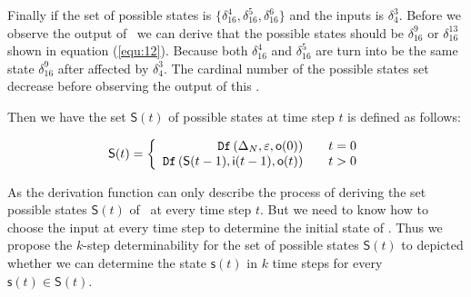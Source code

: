 \begin{example}
 Finally if the set of possible states is $\{\delta_{16}^4,\delta_{16}^5,\delta_{16}^6\}$ and the inputs is $\delta_4^3$. Before we observe the output of \BCN\ we can derive that the possible states should be $\delta_{16}^9$ or $\delta_{16}^{13}$ shown in equation (\ref{equ:12}). Because both $\delta_{16}^4$ and $\delta_{16}^5$ are turn into be the same state $\delta_{16}^9$ after affected by $\delta_4^3$. The cardinal number of the possible states set decrease before observing the output of this \BCN.%
 \label{exa:8}
 \end{example}   
 
 Then we have the set $\mathsf{S}(t)$ of possible states at time step $t$ is defined as follows:
 \begin{definition}[$\mathsf{S}(t)$]
	\[\mathsf{S}(t)=\left\{
\begin{array}{rcl}
{\tt Df}\left(\Delta_N,\varepsilon,\mathsf{o}(0)\right)      &      & {t=0}\\
{\tt Df}\left(\mathsf{S}(t-1),\mathsf{i}(t-1),\mathsf{o}(t)\right)       &      & {t>0}
\end{array} \right. \]
\end{definition}
 
 As the derivation function can only describe the process of deriving the set possible states $\mathsf{S}(t)$ of \BCNs\ at every time step $t$. But we need to know how to choose the input at every time step to determine the initial state of \BCNs. Thus we propose the $k$-step determinability for the set of possible states $\mathsf{S}(t)$ to depicted whether we can determine the state $\mathsf{s}(t)$ in $k$ time steps for every $\mathsf{s}(t)\in \mathsf{S}(t)$.
